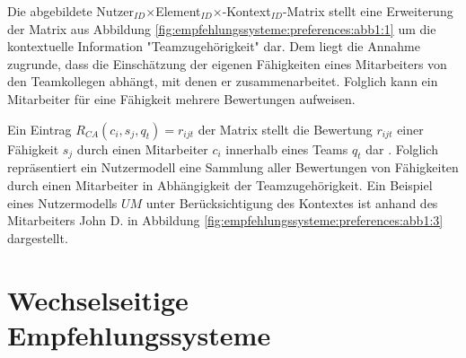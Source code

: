 Die abgebildete Nutzer$_{ID}$$\times$Element$_{ID}$$\times$-Kontext$_{ID}$-Matrix stellt eine Erweiterung der Matrix aus Abbildung \ref{fig:empfehlungssysteme:preferences:abb1:1} um die kontextuelle Information "Teamzugehörigkeit" dar.
Dem liegt die Annahme zugrunde, dass die Einschätzung der eigenen Fähigkeiten eines Mitarbeiters von den Teamkollegen abhängt, mit denen er zusammenarbeitet.
Folglich kann ein Mitarbeiter für eine Fähigkeit mehrere Bewertungen aufweisen.

Ein Eintrag $R_{CA}(c_{i},s_{j},q_{t}) = r_{ijt}$ der Matrix stellt die Bewertung $r_{ijt}$ einer Fähigkeit $s_{j}$ durch einen Mitarbeiter $c_{i}$ innerhalb eines Teams $q_{t}$ dar \cite[S. 198]{adomavicius:3:inbook}.
Folglich repräsentiert ein Nutzermodell eine Sammlung aller Bewertungen von Fähigkeiten durch einen Mitarbeiter in Abhängigkeit der Teamzugehörigkeit.
Ein Beispiel eines Nutzermodells $UM$ unter Berücksichtigung des Kontextes ist anhand des Mitarbeiters John D. in Abbildung \ref{fig:empfehlungssysteme:preferences:abb1:3} dargestellt.

\section{Wechselseitige Empfehlungssysteme}
\label{ch:empfehlungssysteme:rrs}
 

